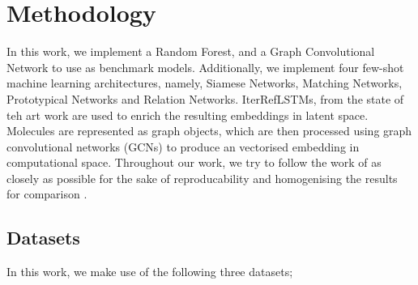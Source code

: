 
\section{Methodology}

In this work, we implement a Random Forest, and a Graph Convolutional Network to use as benchmark models. Additionally, we implement four few-shot machine learning architectures, namely, Siamese Networks, Matching Networks, Prototypical Networks and Relation Networks. IterRefLSTMs, from the state of teh art work are used to enrich the resulting embeddings in latent space. Molecules are represented as graph objects, which are then processed using graph convolutional networks (GCNs) to produce an vectorised embedding in computational space. Throughout our work, we try to follow the work of \citet{altae2017low} as closely as possible for the sake of reproducability and homogenising the  results for comparison
.

\subsection{Datasets}

In this work, we make use of the following three datasets;

